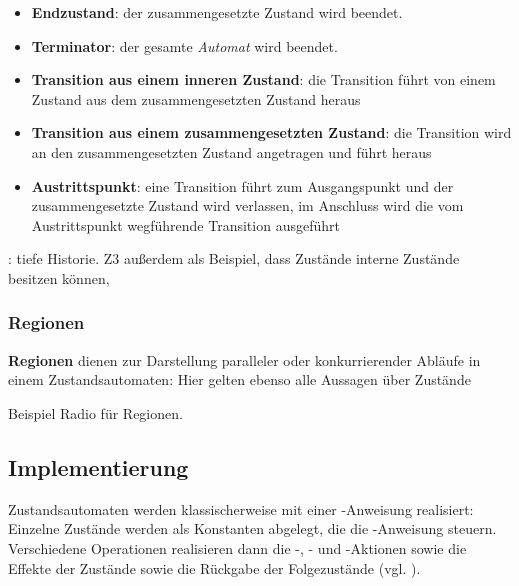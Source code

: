 \begin{itemize}
    \item \textbf{Endzustand}: der zusammengesetzte Zustand wird beendet.
    \item \textbf{Terminator}: der gesamte \textit{Automat} wird beendet.
    \item \textbf{Transition aus einem inneren Zustand}: die Transition führt von einem Zustand aus dem zusammengesetzten Zustand heraus
    \item \textbf{Transition aus einem zusammengesetzten Zustand}: die Transition wird an den zusammengesetzten Zustand angetragen und führt heraus
    \item \textbf{Austrittspunkt}: eine Transition führt zum Ausgangspunkt und der zusammengesetzte Zustand wird verlassen, im Anschluss wird die vom Austrittspunkt wegführende Transition ausgeführt
\end{itemize}


\begin{tcolorbox}[colback=yellow!20]
\cite[Abb. 6.11.7, 342]{Bal05}: tiefe Historie. Z3 außerdem als Beispiel, dass Zustände interne Zustände besitzen können,
\end{tcolorbox}

\subsubsection*{Regionen}
\textbf{Regionen} dienen zur Darstellung paralleler oder konkurrierender Abläufe in einem Zustandsautomaten: Hier gelten ebenso alle Aussagen über Zustände


\begin{tcolorbox}[colback=yellow!20]
    Beispiel Radio für Regionen.
\end{tcolorbox}

\subsection{Implementierung}
Zustandsautomaten werden klassischerweise mit einer -Anweisung realisiert: Einzelne Zustände werden als Konstanten abgelegt, die die -Anweisung steuern.\\
Verschiedene Operationen realisieren dann die -, - und -Aktionen sowie die Effekte der Zustände sowie die Rückgabe der Folgezustände (vgl. \cite[75]{Buh09}).